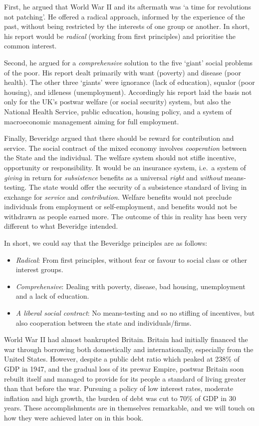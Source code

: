 \documentclass[]{tufte-handout}
\providecommand{\tightlist}{%
  \setlength{\itemsep}{0pt}\setlength{\parskip}{0pt}}
\begin{document}
First, he argued that World War II and its aftermath was `a time for
revolutions not patching'. He offered a radical approach, informed by
the experience of the past, without being restricted by the interests of
one group or another. In short, his report would be \emph{radical}
(working from first principles) and prioritise the common interest.

Second, he argued for a \emph{comprehensive} solution to the five
`giant' social problems of the poor. His report dealt primarily with
want (poverty) and disease (poor health). The other three `giants' were
ignorance (lack of education), squalor (poor housing), and idleness
(unemployment). Accordingly his report laid the basis not only for the
UK's postwar welfare (or social security) system, but also the National
Health Service, public education, housing policy, and a system of
macroeconomic management aiming for full employment.

Finally, Beveridge argued that there should be reward for contribution
and service. The social contract of the mixed economy involves
\emph{cooperation} between the State and the individual. The welfare
system should not stifle incentive, opportunity or responsibility. It
would be an insurance system, i.e.~a system of \emph{giving} in return
for \emph{subsistence} benefits as a universal \emph{right} and
\emph{without} means-testing. The state would offer the security of a
subsistence standard of living in exchange for \emph{service} and
\emph{contribution}. Welfare benefits would not preclude individuals
from employment or self-employment, and benefits would not be withdrawn
as people earned more. The outcome of this in reality has been very
different to what Beveridge intended.

In short, we could say that the Beveridge principles are as follows:

\begin{itemize}
\tightlist
\item
  \emph{Radical}: From first principles, without fear or favour to
  social class or other interest groups.
\item
  \emph{Comprehensive}: Dealing with poverty, disease, bad housing,
  unemployment and a lack of education.
\item
  \emph{A liberal social contract}: No means-testing and so no stifling
  of incentives, but also cooperation between the state and
  individuals/firms.
\end{itemize}

World War II had almost bankrupted Britain. Britain had initially
financed the war through borrowing both domestically and
internationally, especially from the United States. However, despite a
public debt ratio which peaked at 238\% of GDP in 1947, and the gradual
loss of its prewar Empire, postwar Britain soon rebuilt itself and
managed to provide for its people a standard of living greater than that
before the war. Pursuing a policy of low interest rates, moderate
inflation and high growth, the burden of debt was cut to 70\% of GDP in
30 years. These accomplishments are in themselves remarkable, and we
will touch on how they were achieved later on in this book.
\end{document}
